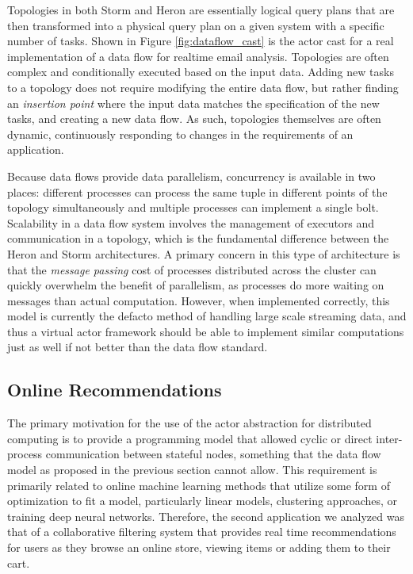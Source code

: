 \documentclass[conference,twocolumn,10pt]{IEEEtran}
\begin{document}
Topologies in both Storm and Heron are essentially logical query plans that are then transformed into a physical query plan on a given system with a specific number of tasks. Shown in Figure \ref{fig:dataflow_cast} is the actor cast for a real implementation of a data flow for realtime email analysis. Topologies are often complex and conditionally executed based on the input data. Adding new tasks to a topology does not require modifying the entire data flow, but rather finding an \textit{insertion point} where the input data matches the specification of the new tasks, and creating a new data flow. As such, topologies themselves are often dynamic, continuously responding to changes in the requirements of an application.

Because data flows provide data parallelism, concurrency is available in two places: different processes can process the same tuple in different points of the topology simultaneously and multiple processes can implement a single bolt. Scalability in a data flow system involves the management of executors and communication in a topology, which is the fundamental difference between the Heron and Storm architectures. A primary concern in this type of architecture is that the \textit{message passing} cost of processes distributed across the cluster can quickly overwhelm the benefit of parallelism, as processes do more waiting on messages than actual computation. However, when implemented correctly, this model is currently the defacto method of handling large scale streaming data, and thus a virtual actor framework should be able to implement similar computations just as well if not better than the data flow standard.

\subsection{Online Recommendations}

The primary motivation for the use of the actor abstraction for distributed computing is to provide a programming model that allowed cyclic or direct inter-process communication between stateful nodes, something that the data flow model as proposed in the previous section cannot allow. This requirement is primarily related to online machine learning methods that utilize some form of optimization to fit a model, particularly linear models, clustering approaches, or training deep neural networks. Therefore, the second application we analyzed was that of a collaborative filtering system that provides real time recommendations for users as they browse an online store, viewing items or adding them to their cart.
\end{document}
